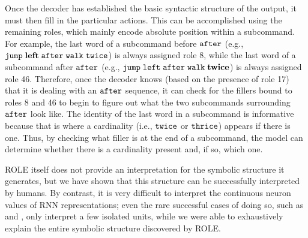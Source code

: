 Once the decoder has established the basic syntactic structure of the output, it must then fill in the particular actions. This can be accomplished using the remaining roles, which mainly encode absolute position within a subcommand. For example, the last word of a subcommand before \textcolor{violet}{${\mathtt{after}}$} (e.g., \textcolor{violet}{${\mathtt{jump \hspace{1mm} \textbf{left} \hspace{1mm} after \hspace{1mm} walk \hspace{1mm} twice}}$}) is always assigned role 8, while the last word of a subcommand after \textcolor{violet}{${\mathtt{after}}$} (e.g., \textcolor{violet}{${\mathtt{jump \hspace{1mm} left \hspace{1mm} after \hspace{1mm} walk \hspace{1mm} \textbf{twice}}}$}) is always assigned role 46. Therefore, once the decoder knows (based on the presence of role 17) that it is dealing with an \textcolor{violet}{${\mathtt{after}}$} sequence, it can check for the fillers bound to roles 8 and 46 to begin to figure out what the two subcommands surrounding \textcolor{violet}{${\mathtt{after}}$} look like. The identity of the last word in a subcommand is informative because that is where a cardinality (i.e., \textcolor{violet}{${\mathtt{twice}}$} or \textcolor{violet}{${\mathtt{thrice}}$}) appears if there is one. Thus, by checking what filler is at the end of a subcommand, the model can determine whether there is a cardinality present and, if so, which one.

ROLE itself does not provide an interpretation for the symbolic structure it generates, but
we have shown that this structure can be successfully interpreted by humans. By contrast, it is very difficult to interpret the continuous neuron values of RNN representations; even the rare successful cases of doing so, such as \citet{lakretz2019emergence} and \citet{mu2020compositional}, only interpret a few isolated units, while we were able to exhaustively explain the entire symbolic structure discovered by ROLE.


